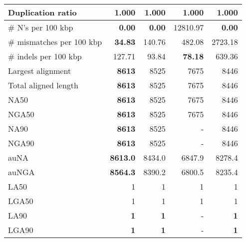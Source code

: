 \documentclass[12pt,a4paper]{article}
\begin{document}
\begin{table}[ht]
\begin{center}
\begin{tabular}{|l*{4}{|r}|}
Duplication ratio & 1.000 & 1.000 & 1.000 & 1.000 \\ \hline
\# N's per 100 kbp & {\bf 0.00} & {\bf 0.00} & 12810.97 & {\bf 0.00} \\ \hline
\# mismatches per 100 kbp & {\bf 34.83} & 140.76 & 482.08 & 2723.18 \\ \hline
\# indels per 100 kbp & 127.71 & 93.84 & {\bf 78.18} & 639.36 \\ \hline
Largest alignment & {\bf 8613} & 8525 & 7675 & 8446 \\ \hline
Total aligned length & {\bf 8613} & 8525 & 7675 & 8446 \\ \hline
NA50 & {\bf 8613} & 8525 & 7675 & 8446 \\ \hline
NGA50 & {\bf 8613} & 8525 & 7675 & 8446 \\ \hline
NA90 & {\bf 8613} & 8525 & - & 8446 \\ \hline
NGA90 & {\bf 8613} & 8525 & - & 8446 \\ \hline
auNA & {\bf 8613.0} & 8434.0 & 6847.9 & 8278.4 \\ \hline
auNGA & {\bf 8564.3} & 8390.2 & 6800.5 & 8235.4 \\ \hline
LA50 & 1 & 1 & 1 & 1 \\ \hline
LGA50 & 1 & 1 & 1 & 1 \\ \hline
LA90 & {\bf 1} & {\bf 1} & - & {\bf 1} \\ \hline
LGA90 & {\bf 1} & {\bf 1} & - & {\bf 1} \\ \hline
\end{tabular}
\end{center}
\end{table}
\end{document}
